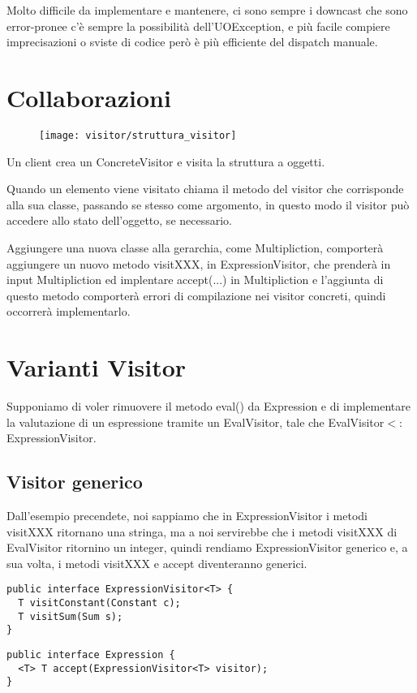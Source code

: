 Molto difficile da implementare e mantenere, ci sono sempre i downcast che sono error-pronee c’è sempre la possibilità dell’UOException, e più facile compiere 
imprecisazioni o sviste di codice però è più efficiente del dispatch manuale.

\section{Collaborazioni}

\begin{figure}[H]
  \centering
  \texttt{[image: visitor/struttura\_visitor]}
\end{figure}

Un client crea un ConcreteVisitor e visita la struttura a oggetti.

Quando un elemento viene visitato chiama il metodo del visitor che corrisponde alla sua classe, passando se stesso come argomento, in questo modo il visitor può 
accedere allo stato dell’oggetto, se necessario.
\smallskip

Aggiungere una nuova classe alla gerarchia, come Multipliction, comporterà aggiungere un nuovo metodo visitXXX, in ExpressionVisitor, che prenderà in input 
Multipliction ed implentare accept(...) in Multipliction e l'aggiunta di questo metodo comporterà errori di compilazione nei visitor concreti, quindi occorrerà 
implementarlo.

\section{Varianti Visitor}

Supponiamo di voler rimuovere il metodo eval() da Expression e di implementare la valutazione di un espressione tramite un EvalVisitor, tale che 
EvalVisitor$<:$ExpressionVisitor.

\subsection{Visitor generico}

Dall'esempio precendete, noi sappiamo che in ExpressionVisitor i metodi visitXXX ritornano una stringa, ma a noi servirebbe che i metodi visitXXX di EvalVisitor 
ritornino un integer, quindi rendiamo ExpressionVisitor generico e, a sua volta, i metodi visitXXX e accept diventeranno generici.
\begin{multicols}{2}
\begin{lstlisting}
public interface ExpressionVisitor<T> {
  T visitConstant(Constant c);
  T visitSum(Sum s);
}
\end{lstlisting}
\columnbreak
\begin{lstlisting}
public interface Expression {
  <T> T accept(ExpressionVisitor<T> visitor);
}     
\end{lstlisting}
\end{multicols}

